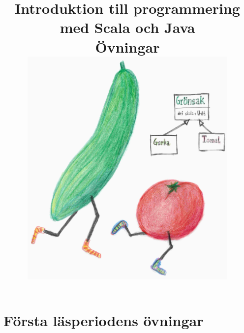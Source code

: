 \documentclass[a4paper]{compendium}
\title{
{\vspace{-3.0cm}\bf\sffamily\Huge\selectfont  Introduktion till programmering med Scala och Java}
\\ \vspace{1em}%
{\sffamily Övningar}\\\vspace{2cm}
\includegraphics[height=12cm]{cover/gurka.jpg}
}
\date{\raggedbottom%
\vspace{-2em}\begin{minipage}{1.0\textwidth}\centering
EDAA45, Lp1-2, HT 2016\\
Datavetenskap, LTH\\
Lunds Universitet\\
~\\
Kompileringsdatum: \today \\
\url{http://cs.lth.se/pgk}
\end{minipage}
}
\newcommand{\SlideHeading}[1]{} %
\newif\ifPreSolution  %
\begin{document}

\frontmatter
\maketitle

%
%

\setcounter{tocdepth}{1} %
\tableofcontents
\mainmatter



\part{Första läsperiodens övningar}



\PreSolutiontrue  
\PreSolutionfalse 


\PreSolutiontrue  
\PreSolutionfalse 


\PreSolutiontrue  
\PreSolutionfalse 


\PreSolutiontrue  
\PreSolutionfalse 


\PreSolutiontrue  
\PreSolutionfalse 


\PreSolutiontrue  
\PreSolutionfalse 


\PreSolutiontrue  
\PreSolutionfalse 
\end{document}
